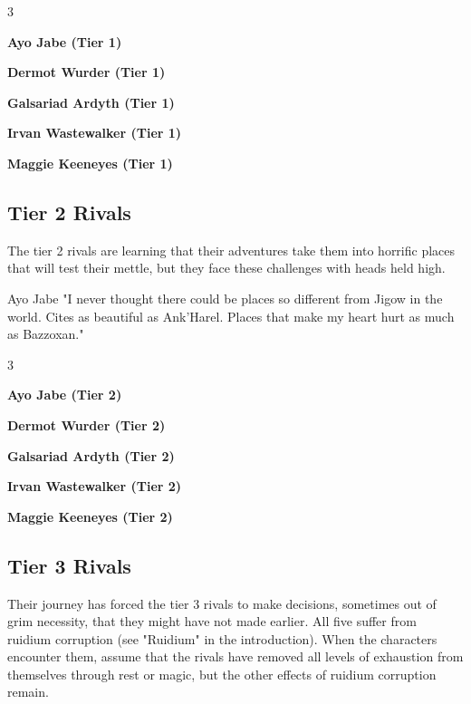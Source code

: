 \documentclass[10pt,a4paper,twoside,bg=print,twocolumn,openany,nodeprecatedcode]{dndbook}
\begin{document}
\begin{itemize}
\begin{multicols}{3}
\item \textbf{Ayo Jabe (Tier 1)}
\item \textbf{Dermot Wurder (Tier 1)}
\item \textbf{Galsariad Ardyth (Tier 1)}
\item \textbf{Irvan Wastewalker (Tier 1)}
\item \textbf{Maggie Keeneyes (Tier 1)}
\end{multicols}

\end{itemize}

\subsection{Tier 2 Rivals}
The tier 2 rivals are learning that their adventures take them into horrific places that will test their mettle, but they face these challenges with heads held high.

\begin{DndReadAloud}{Ayo Jabe}
"I never thought there could be places so different from Jigow in the world. Cites as beautiful as Ank'Harel. Places that make my heart hurt as much as Bazzoxan."

\end{DndReadAloud}


\begin{itemize}
\begin{multicols}{3}
\item \textbf{Ayo Jabe (Tier 2)}
\item \textbf{Dermot Wurder (Tier 2)}
\item \textbf{Galsariad Ardyth (Tier 2)}
\item \textbf{Irvan Wastewalker (Tier 2)}
\item \textbf{Maggie Keeneyes (Tier 2)}
\end{multicols}

\end{itemize}

\subsection{Tier 3 Rivals}
Their journey has forced the tier 3 rivals to make decisions, sometimes out of grim necessity, that they might have not made earlier. All five suffer from ruidium corruption (see "Ruidium" in the introduction). When the characters encounter them, assume that the rivals have removed all levels of exhaustion from themselves through rest or magic, but the other effects of ruidium corruption remain.
\end{document}
